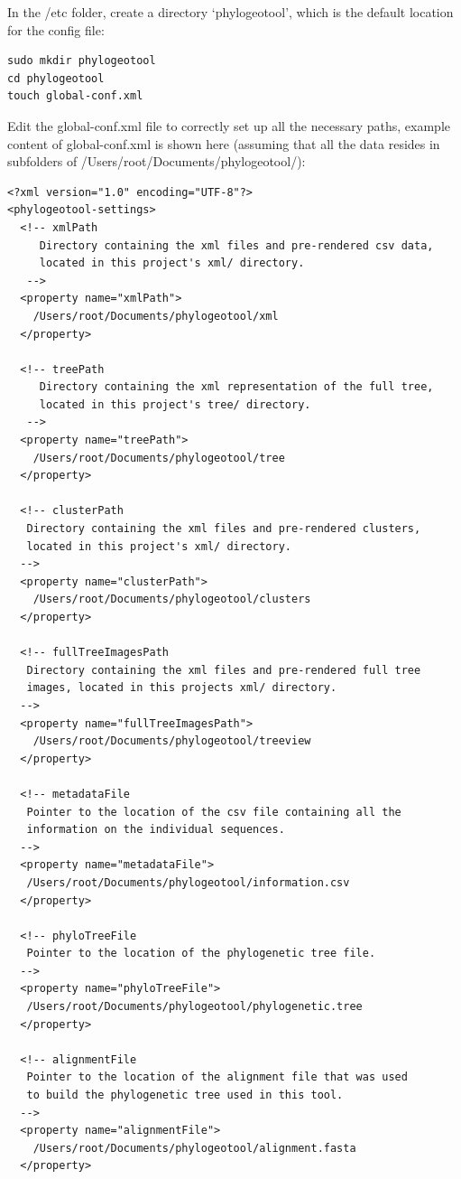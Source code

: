 \documentclass[a4paper, 11pt]{article} %
\begin{document}
In the /etc folder, create a directory `phylogeotool', which is the default location for the config file:
\begin{verbatim}
sudo mkdir phylogeotool
cd phylogeotool
touch global-conf.xml
\end{verbatim}

Edit the global-conf.xml file to correctly set up all the necessary paths, example content of global-conf.xml is shown here (assuming that all the data resides in subfolders of /Users/root/Documents/phylogeotool/):
\begin{verbatim}
<?xml version="1.0" encoding="UTF-8"?>
<phylogeotool-settings>
  <!-- xmlPath
     Directory containing the xml files and pre-rendered csv data,
     located in this project's xml/ directory.
   -->
  <property name="xmlPath">
    /Users/root/Documents/phylogeotool/xml
  </property>

  <!-- treePath
     Directory containing the xml representation of the full tree,
     located in this project's tree/ directory.
   -->
  <property name="treePath">
    /Users/root/Documents/phylogeotool/tree
  </property>
  
  <!-- clusterPath
   Directory containing the xml files and pre-rendered clusters, 
   located in this project's xml/ directory.
  -->
  <property name="clusterPath">
    /Users/root/Documents/phylogeotool/clusters
  </property>
  
  <!-- fullTreeImagesPath
   Directory containing the xml files and pre-rendered full tree 
   images, located in this projects xml/ directory.
  -->   
  <property name="fullTreeImagesPath">
    /Users/root/Documents/phylogeotool/treeview
  </property>

  <!-- metadataFile
   Pointer to the location of the csv file containing all the 
   information on the individual sequences.
  -->
  <property name="metadataFile">
   /Users/root/Documents/phylogeotool/information.csv
  </property>

  <!-- phyloTreeFile
   Pointer to the location of the phylogenetic tree file.
  -->
  <property name="phyloTreeFile">
   /Users/root/Documents/phylogeotool/phylogenetic.tree
  </property>

  <!-- alignmentFile
   Pointer to the location of the alignment file that was used 
   to build the phylogenetic tree used in this tool.
  -->
  <property name="alignmentFile">
    /Users/root/Documents/phylogeotool/alignment.fasta
  </property>
  

\end{verbatim}
\end{document}
